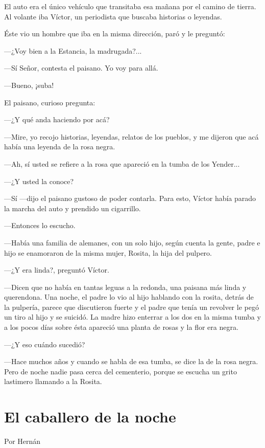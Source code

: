 \documentclass[11pt,twoside,openright,a5paper]{book}
\begin{document}
El auto era el único vehículo que transitaba esa mañana por el camino de tierra. Al volante iba Víctor, un periodista que buscaba historias o leyendas.

Éste vio un hombre que iba en la misma dirección, paró y le preguntó:

---¿Voy bien a la Estancia, la madrugada?...

---Sí Señor, contesta el paisano. Yo voy para allá.

---Bueno, ¡suba!

El paisano, curioso pregunta:

---¿Y qué anda haciendo por acá?

---Mire, yo recojo historias, leyendas, relatos de los pueblos, y me dijeron que acá había una leyenda de la rosa negra.

---Ah, sí usted se refiere a la rosa que apareció en la tumba de los Yender...

---¿Y usted la conoce?

---Sí ---dijo el paisano gustoso de poder contarla. Para esto, Víctor había parado la marcha del auto y prendido un cigarrillo.

---Entonces lo escucho.

---Había una familia de alemanes, con un solo hijo, según cuenta la  gente, padre e hijo se enamoraron de la misma mujer, Rosita, la hija del pulpero.

---¿Y era linda?, preguntó Víctor.

---Dicen que no había en tantas leguas a la redonda, una paisana más linda y querendona. Una noche, el padre lo vio al hijo hablando con la rosita, detrás de la pulpería, parece que discutieron fuerte y el padre que tenía un revolver le pegó un tiro al hijo y se suicidó. La madre hizo enterrar a los dos en la misma tumba y a los pocos días sobre ésta apareció una planta de rosas y la flor era negra.

---¿Y eso cuándo sucedió?

---Hace muchos años y cuando se habla de esa tumba, se dice la de la rosa negra. Pero de noche nadie pasa cerca del cementerio, porque se escucha un grito lastimero llamando a la Rosita.


\section*{El caballero de la noche}
                                                                               \begin{flushright}Por Hernán\end{flushright}
\end{document}
